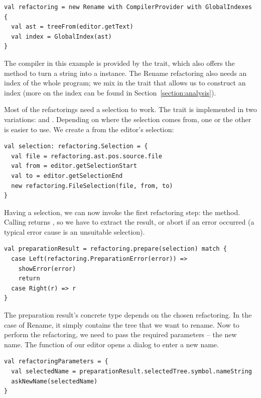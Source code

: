 \documentclass[10pt,a4paper,oneside]{scrreprt}
\begin{document}
\begin{lstlisting}
val refactoring = new Rename with CompilerProvider with GlobalIndexes {
  val ast = treeFrom(editor.getText)
  val index = GlobalIndex(ast)
}
\end{lstlisting}

The compiler in this example is provided by the  trait, which also offers the  method to turn a string into a  instance. The Rename refactoring also needs an index of the whole program; we mix in the  trait that allows us to construct an index (more on the index can be found in Section~\vref{section:analysis}).

Most of the refactorings need a selection to work. The  trait is implemented in two variations:  and . Depending on where the selection comes from, one or the other is easier to use. We create a  from the editor's selection:

\begin{lstlisting}
val selection: refactoring.Selection = {
  val file = refactoring.ast.pos.source.file
  val from = editor.getSelectionStart
  val to = editor.getSelectionEnd
  new refactoring.FileSelection(file, from, to)
}
\end{lstlisting}

Having a selection, we can now invoke the first refactoring step: the  method. Calling  returns , so we have to extract the result, or abort if an error occurred (a typical error cause is an unsuitable selection).

\begin{lstlisting}
val preparationResult = refactoring.prepare(selection) match {
  case Left(refactoring.PreparationError(error)) => 
    showError(error)
    return
  case Right(r) => r
}
\end{lstlisting}

The preparation result's concrete type depends on the chosen refactoring. In the case of Rename, it simply contains the tree that we want to rename. Now to perform the refactoring, we need to pass the required parameters -- the new name. The  function of our editor opens a dialog to enter a new name.

\begin{lstlisting}
val refactoringParameters = {
  val selectedName = preparationResult.selectedTree.symbol.nameString
  askNewName(selectedName)
}
\end{lstlisting}
\end{document}
